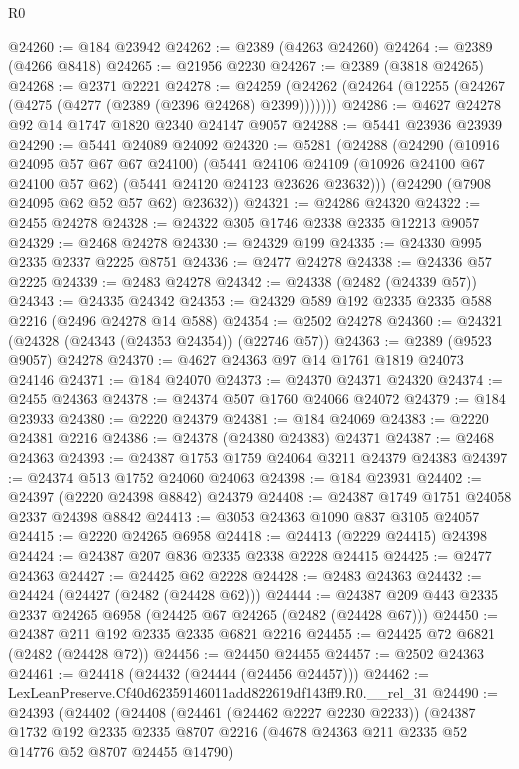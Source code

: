 \begin{lexlean}{R0}
\begin{coremodule}
@24260 := @184 @23942
@24262 := @2389 (@4263 @24260)
@24264 := @2389 (@4266 @8418)
@24265 := @21956 @2230
@24267 := @2389 (@3818 @24265)
@24268 := @2371 @2221
@24278 := @24259 (@24262 (@24264 (@12255 (@24267 (@4275 (@4277 (@2389 (@2396 @24268) @2399)))))))
@24286 := @4627 @24278 @92 @14 @1747 @1820 @2340 @24147 @9057
@24288 := @5441 @23936 @23939
@24290 := @5441 @24089 @24092
@24320 := @5281
    (@24288
      (@24290
        (@10916 @24095 @57 @67 @67 @24100)
        (@5441
          @24106
          @24109
          (@10926 @24100 @67 @24100 @57 @62)
          (@5441 @24120 @24123 @23626 @23632)))
      (@24290 (@7908 @24095 @62 @52 @57 @62) @23632))
@24321 := @24286 @24320
@24322 := @2455 @24278
@24328 := @24322 @305 @1746 @2338 @2335 @12213 @9057
@24329 := @2468 @24278
@24330 := @24329 @199
@24335 := @24330 @995 @2335 @2337 @2225 @8751
@24336 := @2477 @24278
@24338 := @24336 @57 @2225
@24339 := @2483 @24278
@24342 := @24338 (@2482 (@24339 @57))
@24343 := @24335 @24342
@24353 := @24329 @589 @192 @2335 @2335 @588 @2216 (@2496 @24278 @14 @588)
@24354 := @2502 @24278
@24360 := @24321 (@24328 (@24343 (@24353 @24354)) (@22746 @57))
@24363 := @2389 (@9523 @9057) @24278
@24370 := @4627 @24363 @97 @14 @1761 @1819 @24073 @24146
@24371 := @184 @24070
@24373 := @24370 @24371 @24320
@24374 := @2455 @24363
@24378 := @24374 @507 @1760 @24066 @24072
@24379 := @184 @23933
@24380 := @2220 @24379
@24381 := @184 @24069
@24383 := @2220 @24381 @2216
@24386 := @24378 (@24380 @24383) @24371
@24387 := @2468 @24363
@24393 := @24387 @1753 @1759 @24064 @3211 @24379 @24383
@24397 := @24374 @513 @1752 @24060 @24063
@24398 := @184 @23931
@24402 := @24397 (@2220 @24398 @8842) @24379
@24408 := @24387 @1749 @1751 @24058 @2337 @24398 @8842
@24413 := @3053 @24363 @1090 @837 @3105 @24057
@24415 := @2220 @24265 @6958
@24418 := @24413 (@2229 @24415) @24398
@24424 := @24387 @207 @836 @2335 @2338 @2228 @24415
@24425 := @2477 @24363
@24427 := @24425 @62 @2228
@24428 := @2483 @24363
@24432 := @24424 (@24427 (@2482 (@24428 @62)))
@24444 := @24387 @209 @443 @2335 @2337 @24265 @6958 (@24425 @67 @24265 (@2482 (@24428 @67)))
@24450 := @24387 @211 @192 @2335 @2335 @6821 @2216
@24455 := @24425 @72 @6821 (@2482 (@24428 @72))
@24456 := @24450 @24455
@24457 := @2502 @24363
@24461 := @24418 (@24432 (@24444 (@24456 @24457)))
@24462 := LexLeanPreserve.Cf40d62359146011add822619df143ff9.R0.__rel_31
@24490 := @24393
    (@24402
      (@24408
        (@24461 (@24462 @2227 @2230 @2233))
        (@24387
          @1732
          @192
          @2335
          @2335
          @8707
          @2216
          (@4678 @24363 @211 @2335 @52 @14776 @52 @8707 @24455 @14790)

\end{coremodule}
\end{lexlean}
